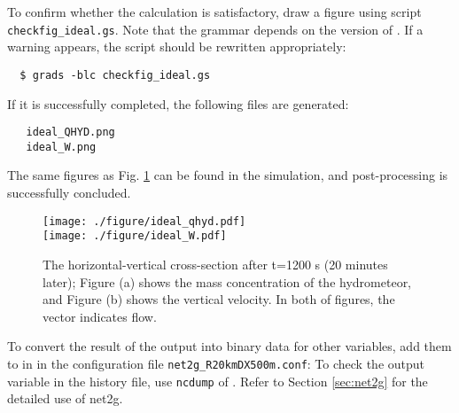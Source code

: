 To confirm whether the calculation is satisfactory,
draw a figure using \grads script \verb|checkfig_ideal.gs|.
Note that the grammar depends on the version of \grads.
If a warning appears, the \grads script should be rewritten appropriately:
\begin{verbatim}
  $ grads -blc checkfig_ideal.gs
\end{verbatim}
If it is successfully completed, the following files are generated:

\begin{verbatim}
   ideal_QHYD.png
   ideal_W.png
\end{verbatim}
The same figures as Fig. \ref{fig_ideal} can be found in the simulation,
and post-processing is successfully concluded.

\begin{figure}[htb]
\begin{center}
  \texttt{[image: ./figure/ideal\_qhyd.pdf]}\\
  \texttt{[image: ./figure/ideal\_W.pdf]}\\
  \caption{The horizontal-vertical cross-section after t=1200 s (20 minutes later);
            Figure (a) shows the mass concentration of the hydrometeor, and 
            Figure (b) shows the vertical velocity. 
            In both of figures, the vector indicates flow.}
  \label{fig_ideal}
\end{center}
\end{figure}

To convert the result of the output into binary data for other variables,
add them to  in  in the configuration file \verb|net2g_R20kmDX500m.conf|:
To check the output variable in the history file, use \verb|ncdump| of {\netcdf}.
Refer to Section \ref{sec:net2g} for the detailed use of net2g.


